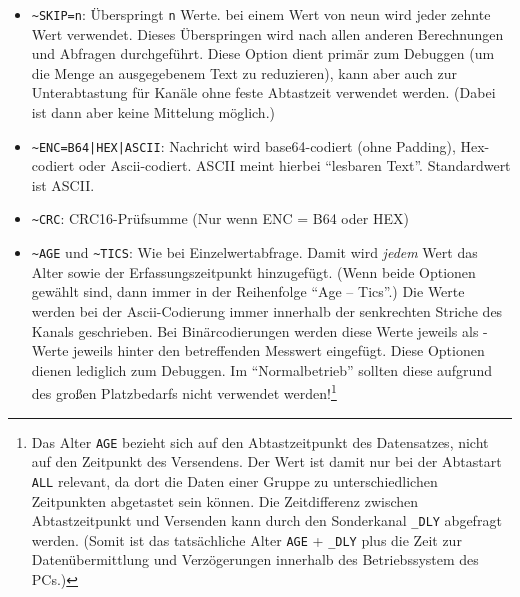 \begin{itemize}
\begin{itemize}
				
		\end{itemize}
	\item \verb+~SKIP=n+: Überspringt \texttt{n} Werte. \Dah bei einem Wert von neun wird jeder zehnte Wert verwendet. Dieses Überspringen wird nach allen anderen Berechnungen und Abfragen durchgeführt. Diese Option dient primär zum Debuggen (um die Menge an ausgegebenem Text zu reduzieren), kann aber auch zur Unterabtastung für Kanäle ohne feste Abtastzeit verwendet werden. (Dabei ist dann aber keine Mittelung möglich.)
	\item \verb+~ENC=B64|HEX|ASCII+: Nachricht wird base64-codiert (ohne Padding), Hex-codiert oder Ascii-codiert. ASCII meint hierbei "`lesbaren Text"'. Standardwert ist ASCII.
	\item \verb+~CRC+: CRC16-Prüfsumme (Nur wenn ENC = B64 oder HEX)
	\item \verb+~AGE+ und \verb+~TICS+: Wie bei Einzelwertabfrage. Damit wird \emph{jedem} Wert das Alter sowie der Erfassungszeitpunkt hinzugefügt. (Wenn beide Optionen gewählt sind, dann immer in der Reihenfolge "`Age -- Tics"'.) Die Werte werden bei der Ascii-Codierung immer innerhalb der senkrechten Striche des Kanals geschrieben. Bei Binärcodierungen werden diese Werte jeweils als -Werte jeweils hinter den betreffenden Messwert eingefügt. Diese Optionen dienen lediglich zum Debuggen. Im "`Normalbetrieb"' sollten diese aufgrund des großen Platzbedarfs nicht verwendet werden!\footnote{Das Alter \texttt{AGE} bezieht sich auf den Abtastzeitpunkt des Datensatzes, nicht auf den Zeitpunkt des Versendens. Der Wert ist damit nur bei der Abtastart \texttt{ALL} relevant, da dort die Daten einer Gruppe zu unterschiedlichen Zeitpunkten abgetastet sein können. Die Zeitdifferenz zwischen Abtastzeitpunkt und Versenden kann durch den Sonderkanal \texttt{\_DLY} abgefragt werden. (Somit ist das tatsächliche Alter \texttt{AGE} + \texttt{\_DLY} plus die Zeit zur Datenübermittlung und Verzögerungen innerhalb des Betriebssystem des PCs.)}
\end{itemize}


